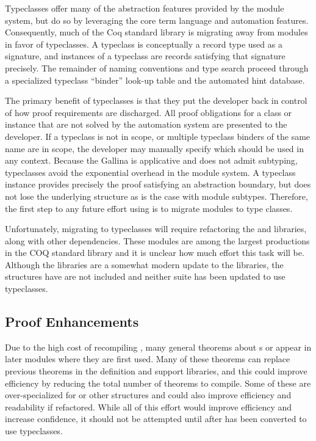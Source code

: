 Typeclasses offer many of the abstraction features provided by the module system, but do so by leveraging the core term language and automation features.
Consequently, much of the Coq standard library is migrating away from modules in favor of typeclasses.
A typeclass is conceptually a record type used as a signature, and instances of a typeclass are records satisfying that signature precisely.
The remainder of naming conventions and type search proceed through a specialized typeclass ``binder'' look-up table and the automated hint database.

The primary benefit of typeclasses is that they put the developer back in control of how proof requirements are discharged.
All proof obligations for a class or instance that are not solved by the automation system are presented to the developer.
If a typeclass is not in scope, or multiple typeclass binders of the same name are in scope, the developer may manually specify which should be used in any context.
Because the Gallina is applicative and does not admit subtyping, typeclasses avoid the exponential overhead in the module system.
A typeclass instance provides precisely the proof satisfying an abstraction boundary, but does not lose the underlying structure as is the case with module subtypes.
Therefore, the first step to any future effort using \TMmodelName{} is to migrate modules to type classes.

Unfortunately, migrating \TMmodelName{} to typeclasses will require refactoring the \COQFSet{} and \COQFMap{} libraries, along with other dependencies.
These modules are among the largest productions in the COQ standard library and it is unclear how much effort this task will be.
Although the \COQMSet{} libraries are a somewhat modern update to the \COQFSet{} libraries, the \COQFMap{} structures have are not included and neither suite has been updated to use typeclasses.


\subsection{Proof Enhancements}

Due to the high cost of recompiling \TMmodelName{}, many general theorems about \COQFSet{}s or \TMsystemStates{} appear in later modules where they are first used.
Many of these theorems can replace previous theorems in the \TMmodelName{} definition and support libraries, and this could improve efficiency by reducing the total number of theorems to compile.
Some of these are over-specialized for \TMaccessGraphs{} or other structures and could also improve efficiency and readability if refactored.
While all of this effort would improve efficiency and increase confidence, it should not be attempted until after \TMmodelName{} has been converted to use typeclasses.

